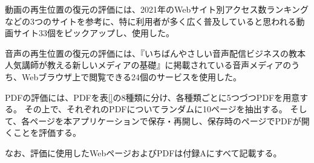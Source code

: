 動画の再生位置の復元の評価には、2021年のWebサイト別アクセス数ランキング\cite{The-50-Most-Visited-Websites-in-the-World}などの3つのサイト\cite{mmd-video-research}\cite{popular-video-service}を参考に、特に利用者が多く広く普及していると思われる動画サイト33個をピックアップし、使用した。

音声の再生位置の復元の評価には、『いちばんやさしい音声配信ビジネスの教本 人気講師が教える新しいメディアの基礎』\cite{}に掲載されている音声メディアのうち、Webブラウザ上で閲覧できる24個のサービスを使用した。

PDFの評価には、PDFを表\ref{}の8種類に分け、各種類ごとに5つづつPDFを用意する。
その上で、それぞれのPDFについてランダムに10ページを抽出する。
そして、各ページを本アプリケーションで保存・再開し、保存時のページでPDFが開くことを評価する。

なお、評価に使用したWebページおよびPDFは付録Aにすべて記載する。





